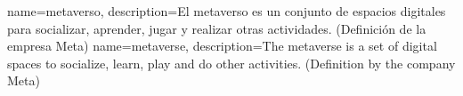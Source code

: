 {name=metaverso,
    description={El metaverso es un conjunto de espacios digitales para socializar, aprender, jugar y realizar otras actividades. (Definición de la empresa Meta)}}
{name=metaverse,
    description={The metaverse is a set of  digital spaces to socialize, learn, play and do other activities. (Definition by the company Meta)}}
